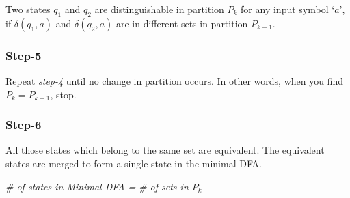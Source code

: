 \begin{multicols}{2}
Two states $q_1$ and $q_2$ are distinguishable in partition $P_k$ for any input symbol `$a$', if $\delta(q_1, a)$ and $\delta(q_2, a)$ are in different sets in partition $P_{k-1}$.

\subsubsection*{Step-5}

Repeat \textit{step-4} until no change in partition occurs. In other words, when you find $P_k = P_{k - 1}$, stop.

\subsubsection*{Step-6}

All those states which belong to the same set are equivalent. The equivalent states are merged to form a single state in the minimal DFA.

\begin{center}
  \textit{\# of states in Minimal DFA = \# of sets in $P_k$  }
\end{center}

\end{multicols}

